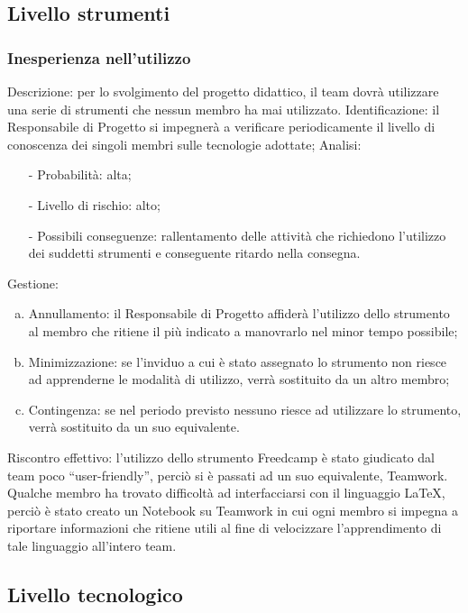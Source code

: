 \documentclass[../PianoProgetto.tex]{subfiles}
\begin{document}
\subsection{Livello strumenti}

\subsubsection{Inesperienza nell’utilizzo}
	Descrizione: per lo svolgimento del progetto didattico, il team dovrà utilizzare una serie di strumenti che nessun membro ha mai utilizzato.
	Identificazione: il Responsabile di Progetto si impegnerà a verificare periodicamente il livello di conoscenza dei singoli membri sulle tecnologie adottate;
	Analisi:
	\begin{itemize}
		\item[-] Probabilità: alta;
		\item[-] Livello di rischio: alto;
		\item[-] Possibili conseguenze: rallentamento delle attività che richiedono l’utilizzo dei suddetti strumenti e conseguente ritardo nella consegna.
	\end{itemize}
	Gestione:
	\begin{enumerate}[(a)]
		\item Annullamento: il Responsabile di Progetto affiderà l’utilizzo dello strumento al membro che ritiene il più indicato a manovrarlo nel minor tempo possibile;
		\item Minimizzazione: se l’inviduo a cui è stato assegnato lo strumento non riesce ad apprenderne le modalità di utilizzo, verrà sostituito da un altro membro;
		\item Contingenza: se nel periodo previsto nessuno riesce ad utilizzare lo strumento, verrà sostituito da un suo equivalente. 
	\end{enumerate}	
	Riscontro effettivo: l’utilizzo dello strumento Freedcamp è stato giudicato dal team poco “user-friendly”, perciò si è passati ad un suo equivalente, Teamwork. 	Qualche membro ha trovato difficoltà ad interfacciarsi con il linguaggio LaTeX, perciò è stato creato un Notebook su Teamwork in cui ogni membro si impegna a riportare informazioni che ritiene utili al fine di velocizzare l’apprendimento di tale linguaggio all’intero team.

\subsection{Livello tecnologico}
\end{document}

